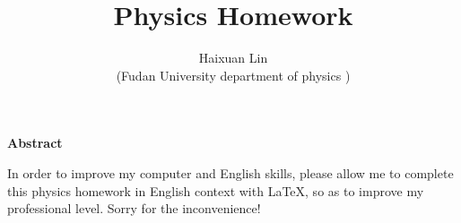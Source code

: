 \documentclass[12pt,a4paper]{article}%
\title{\fontsize{18pt}{27pt}\selectfont%
	{\heiti%
		Physics Homework}}%
\author{\fontsize{12pt}{18pt}\selectfont%
	{\fangsong%
		Haixuan Lin}\\%
	\fontsize{10.5pt}{15.75pt}\selectfont%
	{\fangsong%
		(Fudan University department of physics
		)}}%
\date{}%
\begin{document}
	\maketitle%
	\lhead{}%
	\chead{}%
	\rhead{}%
	\lfoot{}%
	\cfoot{\thepage}%
	\rfoot{}%
	
	
	\begin{center}%
		{\textbf{Abstract}}%
	\end{center}
	\begin{adjustwidth}{1.06cm}{1.06cm}%
		\hspace{1.5em}In order to improve my computer and English skills, please allow me to complete this physics homework in English context with \LaTeX, so as to improve my professional level. Sorry for the inconvenience!
	\end{adjustwidth}
	
	\newpage%
	
	\renewcommand{\contentsname}{Contents}
	\tableofcontents
	\newpage
\end{document}
